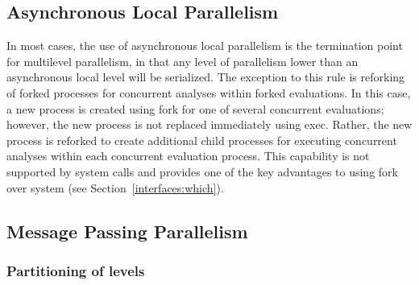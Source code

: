 \subsection{Asynchronous Local Parallelism}\label{parallel:MLP:local}

In most cases, the use of asynchronous local parallelism is the
termination point for multilevel parallelism, in that any level of
parallelism lower than an asynchronous local level will be serialized.
The exception to this rule is reforking of forked processes for
concurrent analyses within forked evaluations.  In this case, a new
process is created using fork for one of several concurrent
evaluations; however, the new process is not replaced immediately
using exec.  Rather, the new process is reforked to create additional
child processes for executing concurrent analyses within each
concurrent evaluation process.  This capability is not supported by
system calls and provides one of the key advantages to using fork over
system (see Section~\ref{interfaces:which}).

\subsection{Message Passing Parallelism}\label{parallel:MLP:message}

\subsubsection{Partitioning of levels}\label{parallel:MLP:message:partitioning}

